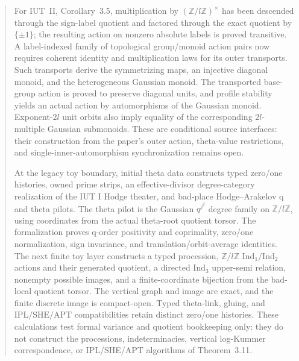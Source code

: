 \documentclass[11pt]{article}
\newcommand{\IndOne}{\ensuremath{\mathrm{Ind}_1}}
\newcommand{\IndTwo}{\ensuremath{\mathrm{Ind}_2}}
\newcommand{\IndThree}{\ensuremath{\mathrm{Ind}_3}}
\newcommand{\SHE}{\ensuremath{\mathrm{SHE}}}
\newcommand{\IPL}{\ensuremath{\mathrm{IPL}}}
\newcommand{\APT}{\ensuremath{\mathrm{APT}}}
\theoremstyle{plain}
\theoremstyle{definition}
\theoremstyle{remark}
\begin{document}
\begin{abstract}
For IUT~II, Corollary~3.5, multiplication by
\((\mathbb Z/l\mathbb Z)^\times\) has been descended through the sign-label
quotient and factored through the exact quotient by \(\{\pm1\}\); the resulting
action on nonzero absolute labels is proved transitive.  A label-indexed family
of topological group/monoid action pairs now requires coherent identity and
multiplication laws for its outer transports.  Such transports derive the
symmetrizing maps, an injective diagonal monoid, and the heterogeneous Gaussian
monoid.  The transported base-group action is proved to preserve diagonal
units, and profile stability yields an actual action by automorphisms of the
Gaussian monoid.  Exponent-\(2l\) unit orbits also imply equality of the corresponding
\(2l\)-multiple Gaussian submonoids.  These are conditional source interfaces:
their construction from the paper's outer action, theta-value restrictions,
and single-inner-automorphism synchronization remains open.

At the legacy toy boundary, initial theta data constructs typed zero/one
histories, owned prime strips, an effective-divisor degree-category realization
of the IUT I Hodge theater, and bad-place Hodge--Arakelov q and theta pilots.
The theta pilot is the Gaussian \(q^{j^2}\) degree family on
\(\mathbb Z/l\mathbb Z\), using coordinates from the actual theta-root quotient
torsor.  The formalization proves q-order positivity and coprimality, zero/one
normalization, sign invariance, and translation/orbit-average identities.
The next finite toy layer constructs a typed procession,
\(\mathbb Z/l\mathbb Z\) \(\IndOne/\IndTwo\) actions and their generated
quotient, a directed \(\IndThree\) upper-semi relation, nonempty possible
images, and a finite-coordinate bijection from the bad-local quotient torsor.
The vertical graph and image are exact, and the finite discrete image is
compact-open.  Typed theta-link, gluing, and \(\IPL/\SHE/\APT\)
compatibilities retain distinct zero/one histories. These calculations test
formal variance and quotient bookkeeping only: they do not construct the
processions, indeterminacies, vertical log-Kummer correspondence, or
IPL/SHE/APT algorithms of Theorem~3.11.


\end{abstract}
\end{document}
